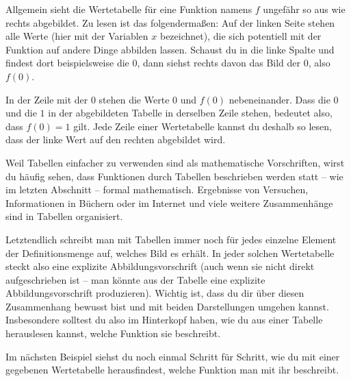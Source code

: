 \documentclass[../../main.tex]{subfiles}
\begin{document}
Allgemein sieht die Wertetabelle für eine Funktion namens $f$ ungefähr so aus wie rechts abgebildet. Zu lesen ist das folgendermaßen: Auf der linken Seite stehen alle Werte (hier mit der Variablen $x$ bezeichnet), die sich potentiell mit der Funktion auf andere Dinge abbilden lassen. Schaust du in die linke Spalte und findest dort beispielsweise die $0$, dann siehst rechts davon das Bild der $0$, also $f(0)$. 

In der Zeile mit der $0$ stehen die Werte $0$ und $f(0)$ nebeneinander. Dass die $0$ und die $1$ in der abgebildeten Tabelle in derselben Zeile stehen, bedeutet also, dass $f(0)=1$ gilt. Jede Zeile einer Wertetabelle kannst du deshalb so lesen, dass der linke Wert auf den rechten abgebildet wird.

Weil Tabellen einfacher zu verwenden sind als mathematische Vorschriften, wirst du häufig sehen, dass Funktionen durch Tabellen beschrieben werden statt -- wie im letzten Abschnitt -- formal mathematisch. Ergebnisse von Versuchen, Informationen in Büchern oder im Internet und viele weitere Zusammenhänge sind in Tabellen organisiert.

Letztendlich schreibt man mit Tabellen immer noch für jedes einzelne Element der Definitionsmenge auf, welches Bild es erhält. In jeder solchen Wertetabelle steckt also eine explizite Abbildungsvorschrift (auch wenn sie nicht direkt aufgeschrieben ist -- man könnte aus der Tabelle eine explizite Abbildungsvorschrift produzieren). Wichtig ist, dass du dir über diesen Zusammenhang bewusst bist und mit beiden Darstellungen umgehen kannst. Insbesondere solltest du also im Hinterkopf haben, wie du aus einer Tabelle herauslesen kannst, welche Funktion sie beschreibt.

Im nächsten Beispiel siehst du noch einmal Schritt für Schritt, wie du mit einer gegebenen Wertetabelle herausfindest, welche Funktion man mit ihr beschreibt.
\end{document}
